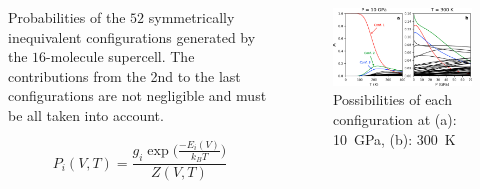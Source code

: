 \documentclass[13pt,aspectratio=169]{beamer}
\begin{document}
\begin{frame}[allowframebreaks]{\subsecname}
	\begin{columns}
		\begin{column}{0.4\textwidth}
			Probabilities of the $52$ symmetrically inequivalent configurations
			generated by the $16$-molecule supercell.
			The contributions from the 2nd to the last configurations
			are not negligible and must be all taken into account.

			\begin{equation*}
				P_i(V, T) = \frac{g_i \exp\Big(\frac{-E_i(V)}{k_B T}\Big)}{Z(V, T)}
			\end{equation*}
		\end{column}

		\begin{column}{0.5\textwidth}
			\vspace{\topsep}
			\begin{figure}
				\includegraphics[width=\columnwidth]{images/ice_prob}%
				\caption{Possibilities of each configuration at (a): \SI{10}{\giga\pascal}, (b): \SI{300}{\kelvin}}
			\end{figure}
		\end{column}
	\end{columns}


\end{frame}
\end{document}
